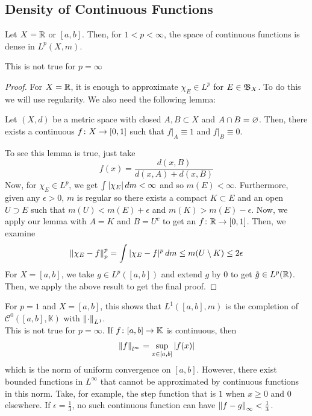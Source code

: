 \documentclass[11pt,leqno,oneside]{amsbook}
\numberwithin{thm}{section}
\newcommand{\K}{\mathbb{K}} %
\renewcommand{\emptyset}{\varnothing}
\begin{document}
\subsection{Density of Continuous Functions}
  \begin{thm}
    Let \(X = \R\) or \([a,b]\). Then, for \(1 < p < \infty\), the
    space of continuous functions is dense in \(L^p(X,m)\).
  \end{thm}
  \begin{rmk}
    This is not true for \(p=\infty\)
  \end{rmk}
  \begin{proof}
    For \(X=\R\), it is enough to approximate \(\chi_E \in L^p\) for \(E \in
    \B_X\). To do this we will use regularity. We also need the
    following lemma:
    \begin{lem}
      Let \((X,d)\) be a metric space with closed \(A,B \subset X\)
      and \(A \intersect B = \emptyset\). Then, there exists a continuous \(f
      \from X \to [0,1]\) such that \(f|_A \equiv 1\) and \(f|_B
      \equiv 0\). 
    \end{lem}
    To see this lemma is true, just take \[
      f(x) = \frac{d(x,B)}{d(x,A) + d(x,B)}
    \]
    Now, for \(\chi_E \in L^p\), we get \(\int |\chi_E| \d m <
    \infty\) and so \(m(E) < \infty\). Furthermore, given any
    \(\epsilon > 0\), \(m\) is regular so there exists a compact \(K
    \subset E\) and an open \(U \supset E\) such that \(m(U) <
    m(E)+\epsilon\) and \(m(K) > m(E)-\epsilon\). Now, we apply our
    lemma with \(A = K\) and \(B = U^c\) to get an \(f \from \R \to
    [0,1]\). Then, we examine \[
      \norm[\chi_E - f]_p^p = \int |\chi_E - f|^p \d m \leq m(U
      \setminus K) \leq 2 \epsilon
    \]
    For \(X = [a,b]\), we take \(g \in L^p([a,b])\) and extend \(g\)
    by 0 to get \(\tilde{g} \in L^p(\R)\). Then, we apply the above
    result to get the final proof.
  \end{proof}
  \begin{rmk}
    For \(p=1\) and \(X = [a,b]\), this shows that \(L^1([a,b],m)\) is
    the completion of \(\mathcal{C}^0([a,b],\K)\) with
    \(\norm_{L^1}\). \\

    This is not true for \(p=\infty\). If \(f \from [a,b] \to \K\) is
    continuous, then \[
      \norm[f]_{l^\infty} = \sup_{x \in [a,b]} |f(x)|
    \]
    which is the norm of uniform convergence on \([a,b]\).  However,
    there exist bounded functions in \(L^\infty\) that cannot be
    approximated by continuous functions in this norm. Take, for
    example, the step function that is \(1\) when \(x \geq 0\) and
    \(0\) elsewhere. If \(\epsilon = \frac{1}{3}\), no such continuous
    function can have \(\norm[f-g]_\infty < \frac{1}{3}\).
  \end{rmk}
\end{document}
